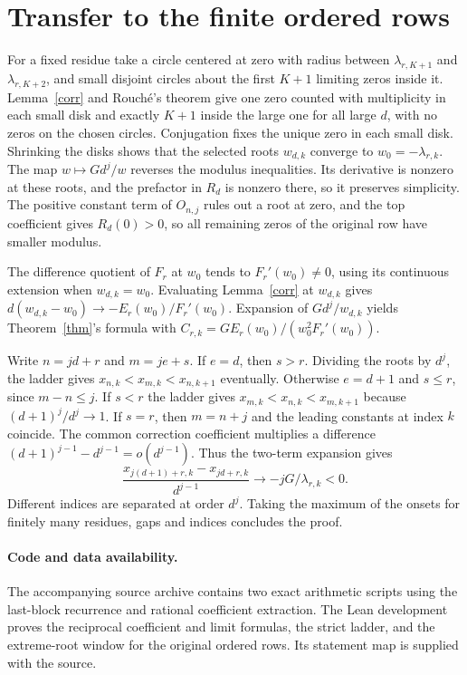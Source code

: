 \documentclass[11pt]{amsart}
\begin{document}
\section{Transfer to the finite ordered rows}
For a fixed residue take a circle centered at zero with radius between
$\lambda_{r,K+1}$ and $\lambda_{r,K+2}$, and small disjoint circles
about the first $K+1$ limiting zeros inside it. Lemma~\ref{corr}
and Rouch\'e's theorem give one zero counted with multiplicity in each
small disk and exactly $K+1$ inside the large one for all large $d$,
with no zeros on the chosen circles. Conjugation fixes the unique zero
in each small disk. Shrinking the disks shows that the selected roots
$w_{d,k}$ converge to $w_0=-\lambda_{r,k}$. The map $w\mapsto Gd^j/w$
reverses the modulus inequalities. Its derivative is nonzero at these
roots, and the prefactor in $R_d$ is nonzero there, so it preserves
simplicity. The positive constant term of $O_{n,j}$ rules out a root at
zero, and the top coefficient gives $R_d(0)>0$, so all remaining zeros
of the original row have smaller modulus.

The difference quotient of $F_r$ at $w_0$ tends to $F_r'(w_0)\ne0$,
using its continuous extension when $w_{d,k}=w_0$.
Evaluating Lemma~\ref{corr} at $w_{d,k}$ gives
$d(w_{d,k}-w_0)\to-E_r(w_0)/F_r'(w_0)$.
Expansion of $Gd^j/w_{d,k}$ yields Theorem~\ref{thm}'s formula
with $C_{r,k}=GE_r(w_0)/(w_0^2 F_r'(w_0))$.

Write $n=jd+r$ and $m=je+s$. If $e=d$, then $s>r$. Dividing the roots
by $d^j$, the ladder gives $x_{n,k}<x_{m,k}<x_{n,k+1}$ eventually.
Otherwise $e=d+1$ and $s\le r$, since $m-n\le j$. If $s<r$ the ladder
gives $x_{m,k}<x_{n,k}<x_{m,k+1}$ because $(d+1)^j/d^j\to1$.
If $s=r$, then $m=n+j$ and the leading constants at index $k$ coincide.
The common correction coefficient multiplies a difference
$(d+1)^{j-1}-d^{j-1}=o(d^{j-1})$. Thus the two-term expansion gives
\[
 \frac{x_{j(d+1)+r,k}-x_{jd+r,k}}{d^{j-1}}
       \longrightarrow -jG/\lambda_{r,k}<0 .
\]
Different indices are separated at order $d^j$. Taking the maximum
of the onsets for finitely many residues, gaps and indices concludes
the proof.

\paragraph{Code and data availability.}
The accompanying source archive contains two exact arithmetic scripts
using the last-block recurrence and rational coefficient
extraction. The Lean development proves the reciprocal coefficient and
limit formulas, the strict ladder, and the extreme-root window for the
original ordered rows. Its statement map is supplied with the source.
\end{document}
